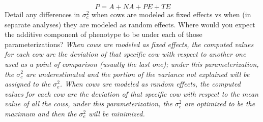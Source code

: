 \documentclass[12pt,a4paper]{paper}
\begin{document}
\begin{enumerate}
\[P = A + NA + PE + TE\]
Detail any differences in $\sigma^{2}_{c}$ when cows are modeled as fixed effects vs when (in separate analyses) they are modeled as random effects. Where would you expect the additive component of phenotype to be under each of those parameterizations? \textit{When cows are modeled as fixed effects, the computed values for each cow are the deviation of that specific cow with respect to another one used as a point of comparison (usually the last one); under this parameterization, the $\sigma^{2}_{c}$ are underestimated and the portion of the variance not explained will be assigned to the $\sigma^{2}_{e}$. When cows are modeled as random effects, the computed values for each cow are the deviation of that specific cow with respect to the mean value of all the cows, under this parameterization, the $\sigma^{2}_{c}$ are optimized to be the maximum and then the $\sigma^{2}_{e}$ will be minimized.}
\end{enumerate}
\end{document}
